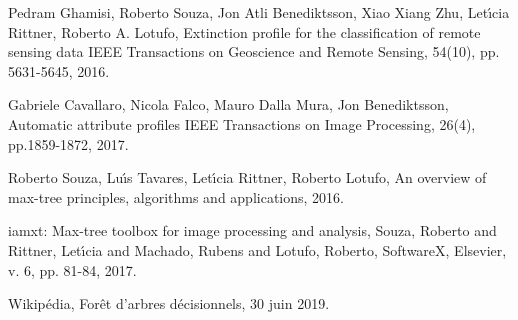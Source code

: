 \documentclass[paper=a4, 11pt]{article}
\begin{document}
\begin{thebibliography}{9}  
	Pedram Ghamisi, Roberto Souza, Jon Atli Benediktsson, Xiao Xiang Zhu, Let{\'\i}cia Rittner, Roberto A. Lotufo,
Extinction profile for the classification of remote sensing data IEEE Transactions on Geoscience and Remote
Sensing, 54(10), pp. 5631-5645, 2016.

	Gabriele Cavallaro, Nicola Falco, Mauro Dalla Mura, Jon Benediktsson, Automatic attribute profiles IEEE
Transactions on Image Processing, 26(4), pp.1859-1872, 2017.

	Roberto Souza, Lu{\'\i}s Tavares, Let{\'\i}cia Rittner, Roberto Lotufo,
	An overview of max-tree principles, algorithms and applications,
	2016.

	  iamxt: Max-tree toolbox for image processing and analysis,
	  Souza, Roberto and Rittner, Let{\'\i}cia and Machado, Rubens and Lotufo, Roberto,
	  SoftwareX,
	  Elsevier,
	  v. 6, pp. 81-84,
	  2017.
	  
	Wikipédia, 
	Forêt d'arbres décisionnels,
	30 juin 2019.
\end{thebibliography}
\end{document}
